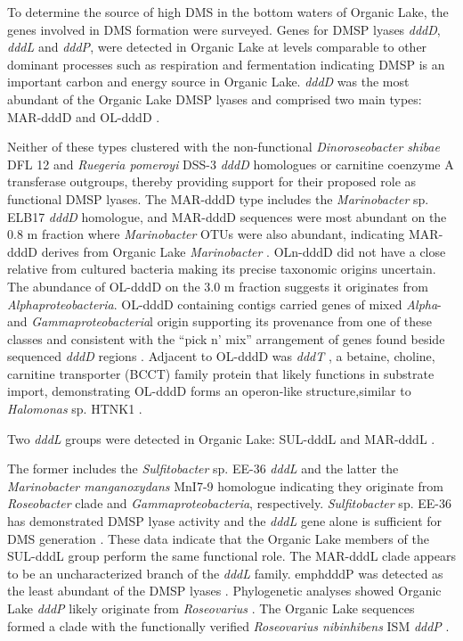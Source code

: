 To determine the source of high \ac{DMS} in the bottom waters of Organic Lake, the genes involved in \ac{DMS} formation were surveyed.
 Genes for \ac{DMSP} lyases \emph{dddD}, \emph{dddL} and \emph{dddP}, were detected in Organic Lake at levels comparable to other dominant processes such as respiration and fermentation  indicating \ac{DMSP} is an important carbon and energy source in Organic Lake. 
\emph{dddD} was the most abundant of the Organic Lake \ac{DMSP} lyases  and comprised two main types: MAR-dddD and OL-dddD .
 
Neither of these types clustered with the non-functional \emph{Dinoroseobacter shibae} DFL 12 and \emph{Ruegeria pomeroyi} DSS-3 \emph{dddD} homologues \cite{Todd2011} or carnitine coenzyme A transferase outgroups, thereby providing support for their proposed role as functional \ac{DMSP} lyases. 
The MAR-dddD type includes the \emph{Marinobacter} sp. ELB17 \emph{dddD} homologue, and MAR-dddD sequences were most abundant on the 0.8 \textmu{}m fraction where \emph{Marinobacter} \acp{OTU} were also abundant, indicating MAR-dddD derives from Organic Lake \emph{Marinobacter} . 
OLn-dddD did not have a close relative from cultured bacteria making its precise taxonomic origins uncertain. 
The abundance of OL-dddD on the 3.0 \textmu{}m fraction suggests it originates from \emph{Alphaproteobacteria}. 
OL-dddD containing contigs carried genes of mixed \emph{Alpha}- and \emph{Gammaproteobacteria}l origin supporting its provenance from one of these classes and consistent with the ``pick n' mix'' arrangement of genes found beside sequenced \emph{dddD} regions \cite{Johnston2008} . 
Adjacent to OL-dddD was \emph{dddT} , a betaine, choline, carnitine transporter (BCCT) family protein that likely functions in substrate import, demonstrating OL-dddD forms an operon-like structure,similar to \emph{Halomonas} sp. HTNK1 \cite{Todd2010}.


Two \emph{dddL} groups were detected in Organic Lake: SUL-dddL and MAR-dddL . 

The former includes the \emph{Sulfitobacter} sp. EE-36 \emph{dddL} and the latter the \emph{Marinobacter manganoxydans} MnI7-9 homologue indicating they originate from \emph{Roseobacter} clade and \emph{Gammaproteobacteria}, respectively. 
\emph{Sulfitobacter} sp. EE-36 has demonstrated \ac{DMSP} lyase activity and the \emph{dddL} gene alone is sufficient for \ac{DMS} generation \cite{Curson2008}. 
These data indicate that the Organic Lake members of the SUL-dddL group perform the same functional role. 
The MAR-dddL clade appears to be an uncharacterized branch of the \emph{dddL} family. 
emph{dddP} was detected as the least abundant of the \ac{DMSP} lyases . 
Phylogenetic analyses showed Organic Lake \emph{dddP} likely originate from \emph{Roseovarius} . 
The Organic Lake sequences formed a clade with the functionally verified \emph{Roseovarius nibinhibens} ISM \emph{dddP} \cite{Todd2009}. 


